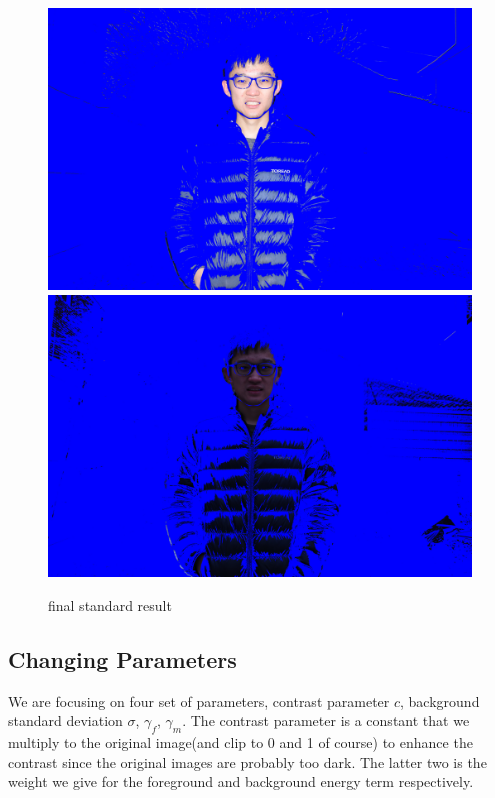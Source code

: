 \documentclass[final]{cvpr}
\begin{document}
\begin{figure}[ht]
   \centering
   \includegraphics[scale=0.035]{../data/output/arthas_final_f_1.2_0.10_10_10.JPG}
   \includegraphics[scale=0.035]{../data/output/arthas_final_nf_1.2_0.10_10_10.JPG}
   \caption{final standard result}
\end{figure}

\subsection{Changing Parameters}
We are focusing on four set of parameters, 
contrast parameter $c$,
background standard deviation $\sigma$,
$\gamma_f$,
$\gamma_m$. The contrast parameter is a constant that 
we multiply to the original image(and clip to 0 and 1 of course) 
to enhance the contrast since the original images are probably 
too dark.
The latter two is the weight we give for 
the foreground and background energy term respectively.
\end{document}
